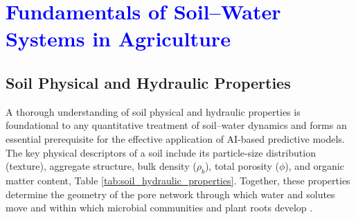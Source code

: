 \documentclass[land,article,submit,pdftex,moreauthors]{Definitions/mdpi}
\numberwithin{equation}{section}
\begin{document}

\section{\textcolor{blue}{Fundamentals of Soil--Water Systems in Agriculture}}

\subsection{Soil Physical and Hydraulic Properties}

A thorough understanding of soil physical and hydraulic properties is foundational to any quantitative treatment of soil--water dynamics and forms an essential prerequisite for the effective application of AI-based predictive models. The key physical descriptors of a soil include its particle-size distribution (texture), aggregate structure, bulk density ($\rho_b$), total porosity ($\phi$), and organic matter content, Table \ref{tab:soil_hydraulic_properties}. Together, these properties determine the geometry of the pore network through which water and solutes move and within which microbial communities and plant roots develop \citep{hillel2004, Lemenkova202318, HILLEL2003407, Lemenkova202224}.

\footnotesize
\setlength{\LTleft}{0pt}
\setlength{\LTright}{0pt}
\end{document}
